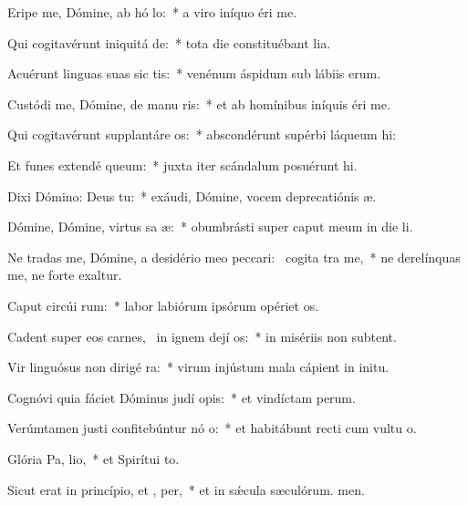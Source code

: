 \item Eripe me, Dómine, ab hó lo:~* a viro iníquo éri me.
\item Qui cogitavérunt iniquitá  de:~* tota die constituébant lia.
\item Acuérunt linguas suas sic tis:~* venénum áspidum sub lábiis erum.
\item Custódi me, Dómine, de manu ris:~* et ab homínibus iníquis éri me.
\item Qui cogitavérunt supplantáre  os:~* abscondérunt supérbi láqueum hi:
\item Et funes extendé  queum:~* juxta iter scándalum posuérunt hi.
\item Dixi Dómino: Deus   tu:~* exáudi, Dómine, vocem deprecatiónis æ.
\item Dómine, Dómine, virtus sa æ:~* obumbrásti super caput meum in die li.
\item Ne tradas me, Dómine, a desidério meo peccari:~\pscross{} cogita tra me,~* ne derelínquas me, ne forte exaltur.
\item Caput circúi rum:~* labor labiórum ipsórum opériet os.
\item Cadent super eos carnes,~\pscross{} in ignem dejí os:~* in misériis non subtent.
\item Vir linguósus non dirigé  ra:~* virum injústum mala cápient in initu.
\item Cognóvi quia fáciet Dóminus judí opis:~* et vindíctam perum.
\item Verúmtamen justi confitebúntur nó o:~* et habitábunt recti cum vultu o.
\item Glória Pa,  lio,~* et Spirítui to.
\item Sicut erat in princípio, et ,  per,~* et in sǽcula sæculórum. men.
